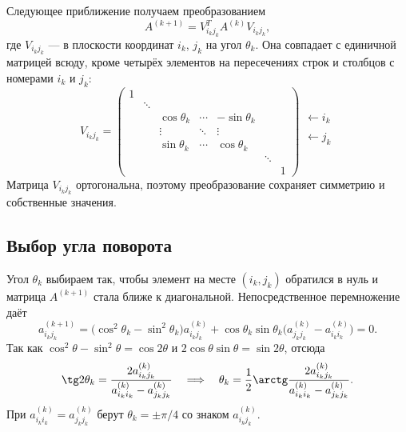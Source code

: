 \documentclass[../final.tex]{subfiles}
\begin{document}
Следующее приближение получаем преобразованием
\begin{equation*}
    A^{(k+1)}=V_{i_kj_k}^TA^{(k)}V_{i_kj_k},
\end{equation*}
где $V_{i_kj_k}$ ---  в плоскости
координат $i_k$, $j_k$ на угол $\theta_k$. Она совпадает с единичной
матрицей всюду, кроме четырёх элементов на пересечениях строк
и столбцов с номерами $i_k$ и $j_k$:
\begin{equation*}
    V_{i_kj_k}=
    \begin{pmatrix}
        1      &        &               &        &               &        &   \\
               & \ddots &               &        &               &        &   \\
               &        & \cos\theta_k  & \cdots & -\sin\theta_k &        &   \\
               &        & \vdots        & \ddots & \vdots        &        &   \\
               &        & \sin\theta_k  & \cdots & \cos\theta_k  &        &   \\
               &        &               &        &               & \ddots &   \\
               &        &               &        &               &        & 1
    \end{pmatrix}
    \begin{matrix}
        \\ \\ \leftarrow i_k \\ \\ \leftarrow j_k \\ \\ \\
    \end{matrix}
\end{equation*}
Матрица $V_{i_kj_k}$ ортогональна, поэтому преобразование
сохраняет симметрию и собственные значения.

\subsection{Выбор угла поворота}

Угол $\theta_k$ выбираем так, чтобы элемент на месте
$(i_k,j_k)$ обратился в нуль и матрица $A^{(k+1)}$ стала
ближе к диагональной. Непосредственное перемножение даёт
\begin{equation*}
    a^{(k+1)}_{i_kj_k}
    =\bigl(\cos^2\theta_k-\sin^2\theta_k\bigr)a^{(k)}_{i_kj_k}
    +\cos\theta_k\sin\theta_k
    \bigl(a^{(k)}_{j_kj_k}-a^{(k)}_{i_ki_k}\bigr)=0.
\end{equation*}
Так как $\cos^2\theta-\sin^2\theta=\cos2\theta$ и
$2\cos\theta\sin\theta=\sin2\theta$, отсюда
\begin{equation*}
    \tg2\theta_k=
    \frac{2a^{(k)}_{i_kj_k}}{a^{(k)}_{i_ki_k}-a^{(k)}_{j_kj_k}}
    \quad\Longrightarrow\quad
    \theta_k=\frac12\arctg
    \frac{2a^{(k)}_{i_kj_k}}{a^{(k)}_{i_ki_k}-a^{(k)}_{j_kj_k}}.
\end{equation*}
При $a^{(k)}_{i_ki_k}=a^{(k)}_{j_kj_k}$ берут $\theta_k=\pm\pi/4$
со знаком $a^{(k)}_{i_kj_k}$.
\end{document}
